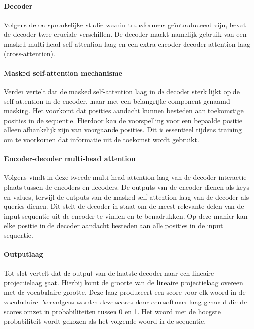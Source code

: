 \paragraph{Decoder}
Volgens de oorspronkelijke studie \autocite{Vaswani2017} waarin transformers geïntroduceerd zijn, bevat de decoder twee cruciale verschillen. De decoder maakt namelijk gebruik van een masked multi-head self-attention laag en een extra encoder-decoder attention laag (cross-attention).

\paragraph{Masked self-attention mechanisme}
Verder vertelt \textcite{Vaswani2017} dat de masked self-attention laag in de decoder sterk lijkt op de self-attention in de encoder, maar met een belangrijke component genaamd masking. Het voorkomt dat posities aandacht kunnen besteden aan toekomstige posities in de sequentie. Hierdoor kan de voorspelling voor een bepaalde positie alleen afhankelijk zijn van voorgaande posities. Dit is essentieel tijdens training om te voorkomen dat informatie uit de toekomst wordt gebruikt.

\paragraph{Encoder-decoder multi-head attention}
Volgens \textcite{ChittyVenkata2023} vindt in deze tweede multi-head attention laag van de decoder interactie plaats tussen de encoders en decoders. De outputs van de encoder dienen als keys en values, terwijl de outputs van de masked self-attention laag van de decoder als queries dienen. Dit stelt de decoder in staat om de meest relevante delen van de input sequentie uit de encoder te vinden en te benadrukken. Op deze manier kan elke positie in de decoder aandacht besteden aan alle posities in de input sequentie.

\paragraph{Outputlaag}
Tot slot vertelt \textcite{Vaswani2017} dat de output van de laatste decoder naar een lineaire projectielaag gaat. Hierbij komt de grootte van de lineaire projectielaag overeen met de vocabulaire grootte. Deze laag produceert een score voor elk woord in de vocabulaire. Vervolgens worden deze scores door een softmax laag gehaald die de scores omzet in probabiliteiten tussen 0 en 1. Het woord met de hoogste probabiliteit wordt gekozen als het volgende woord in de sequentie.

